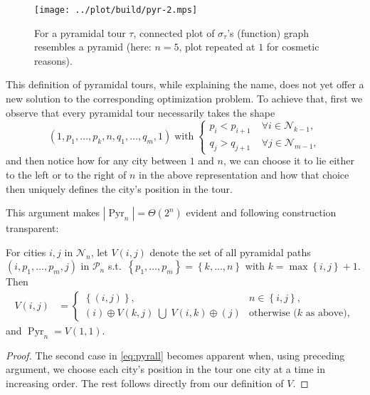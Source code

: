 \documentclass[index=totoc,bibliography=totoc]{scrartcl}
\numberwithin{equation}{section}
\numberwithin{figure}{section}
\numberwithin{table}{section}
\begin{document}
\begin{figure}[bht]
  \centering
  \texttt{[image: ../plot/build/pyr-2.mps]}
  \caption{%
    For a pyramidal tour $\tau$, connected plot of $\sigma_\tau$'s
    (function) graph resembles a pyramid (here: $n = 5$, plot repeated at $1$
    for cosmetic reasons).
  }
\end{figure}

This definition of pyramidal tours, while explaining the name, does not yet
offer a new solution to the corresponding optimization problem.  To achieve
that, first we observe that every pyramidal tour necessarily takes the
shape
\[
\left(1, p_1, \ldots, p_k, n, q_1, \ldots, q_m, 1 \right)
\; \text{with} \;
\begin{cases}
  p_i < p_{i+1} \; & \forall i \in \mathcal{N}_{k-1},\\
  q_j > q_{j+1} \; & \forall j \in \mathcal{N}_{m-1},
\end{cases}
\]
and then notice how for any city between $1$ and $n$,
we can choose it to lie either to the left or to the right of $n$ in the above representation
and how that choice then uniquely defines the city's position in the tour.

This argument makes $\left|\operatorname{Pyr}_n\right| = \Theta\left(2^n\right)$
evident and following construction transparent:

\begin{proposition}
\label{prop:pyrall}
  For cities $i,j$ in $\mathcal{N}_n$,
  let $V\left(i,j\right)$ denote the set of all pyramidal paths
  $\left(i,p_1,\ldots,p_m,j\right)$
  in $\mathcal{P}_n$
  s.t.\ $\left\{p_1,\ldots,p_m\right\} = \left\{k,\ldots,n\right\}$
  with $k = \max\left\{i,j\right\}+1$.  Then
  \begin{align}
    \label{eq:pyrall}
    V\left(i,j\right) & =
    \begin{cases}
      \left\{\left(i,j\right)\right\}, & n \in \left\{i,j\right\},
      \\
      \left(i\right) \oplus V\left(k,j\right)
      \;\bigcup\;
      V\left(i,k\right) \oplus \left(j\right)
      & \text{otherwise ($k$ as above)},
    \end{cases}
  \end{align}
  and $\operatorname{Pyr}_n = V\left(1,1\right)$.
\end{proposition}
\begin{proof}
  The second case in \cref{eq:pyrall} becomes apparent when, using
  preceding argument, we choose each city's position in the tour one city
  at a time in increasing order.  The rest follows directly from our
  definition of $V$.
\end{proof}
\end{document}
